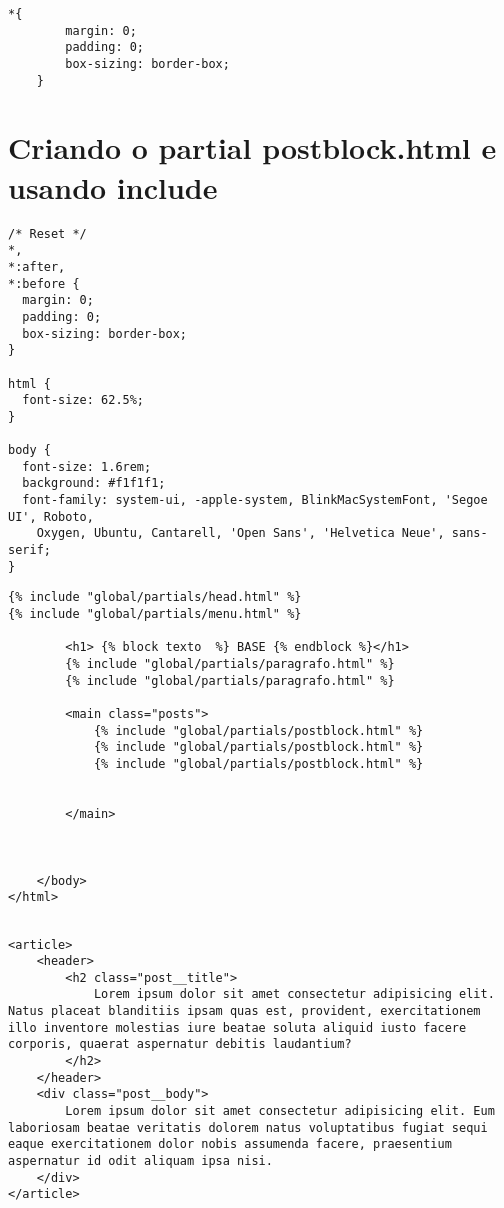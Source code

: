 \documentclass{article}
\begin{document}
\begin{lstlisting}[style=cssStyle, caption={base/static/global/css/style.css}]
    *{
        margin: 0;
        padding: 0;
        box-sizing: border-box; 
    }    

\end{lstlisting}
\section{Criando o partial postblock.html e usando include}
\begin{lstlisting}[style=cssStyle, caption={base/static/global/css/style.css}]
    /* Reset */
*,
*:after,
*:before {
  margin: 0;
  padding: 0;
  box-sizing: border-box;
}

html {
  font-size: 62.5%;
}

body {
  font-size: 1.6rem;
  background: #f1f1f1;
  font-family: system-ui, -apple-system, BlinkMacSystemFont, 'Segoe UI', Roboto,
    Oxygen, Ubuntu, Cantarell, 'Open Sans', 'Helvetica Neue', sans-serif;
}
\end{lstlisting}

\begin{lstlisting}[style=htmlStyle, caption={base/global/base.html}]
{% include "global/partials/head.html" %}
{% include "global/partials/menu.html" %}

        <h1> {% block texto  %} BASE {% endblock %}</h1>
        {% include "global/partials/paragrafo.html" %}
        {% include "global/partials/paragrafo.html" %}

        <main class="posts">
            {% include "global/partials/postblock.html" %}
            {% include "global/partials/postblock.html" %}
            {% include "global/partials/postblock.html" %}
        

        </main>
        
        
        
    </body>
</html>
   
\end{lstlisting}

\begin{lstlisting}[style=htmlStyle, caption={base/global/partials/postblock.html}]
    <article>
    <header>
        <h2 class="post__title">
            Lorem ipsum dolor sit amet consectetur adipisicing elit. Natus placeat blanditiis ipsam quas est, provident, exercitationem illo inventore molestias iure beatae soluta aliquid iusto facere corporis, quaerat aspernatur debitis laudantium?
        </h2>
    </header>
    <div class="post__body">
        Lorem ipsum dolor sit amet consectetur adipisicing elit. Eum laboriosam beatae veritatis dolorem natus voluptatibus fugiat sequi eaque exercitationem dolor nobis assumenda facere, praesentium aspernatur id odit aliquam ipsa nisi.
    </div>
</article>

   
\end{lstlisting}
\end{document}
